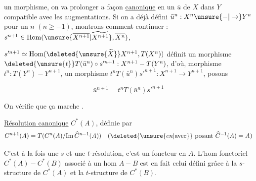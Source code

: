 un morphisme, on va prolonger $u$  façon \uline{canonique} en un  $\bar u$ de $X$ dans $Y$ compatible avec les augmentations. Si on a déjà défini $\bar u^n:X^n\unsure{-|\to}Y^n$  pour un $n$ $(n\geq-1)$, montrons comment continuer :  $s^{n+1}\in\mathrm{Hom}(\unsure{\overline{X^{n+1}}|\widetilde{X^{n+1}}},\overline{X^n})$,


  $s'^{n+1}\simeq\mathrm{Hom}(\deleted{\unsure{\widetilde X}}X^{n+1},T(X^n))$ définit un  morphisme $\deleted{\unsure{t}}T(\bar u^n)\circ s'^{n+1}:X^{n+1}-T(Y^n)$, d'où,   morphisme $t^n:T(Y^n)-Y^{n+1}$, un morphisme  $t^nT(\bar u^n)s'^{n+1}:X^{n+1}\to Y^{n+1}$, posons

\[
\bar u^{n+1}=t^nT(\bar u^n)s'^{n+1}
\]


On vérifie que ça marche \unsure{\ldots}.

\uline{Résolution canonique} $C^*(A)$, définie par
\[
C^{n+1}(A)=T(C^n(A)/\mathrm{Im}\,\widehat C^{n-1}(A))\quad (\deleted{\unsure{en|\text{avec}}}\ \text{posant }\widehat C^{-1}(A)=A)
\]

 C'est à la fois une $s$ et une $t$-résolution, c'est un foncteur en $A$. L'hom fonctoriel $C^*(A)-C^*(B)$ associé à un hom $A-B$ est en fait celui défini grâce à la $s$-structure de $C^*(A)$ et la $t$-structure de $C^*(B)$.

